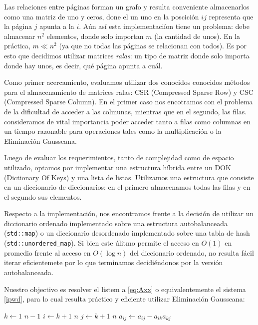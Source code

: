 
\par Las relaciones entre p\'aginas forman un grafo y resulta conveniente almacenarlos como una
matriz de uno y ceros, done el un uno en la poscici\'on $ij$ representa que la p\'agina $j$ apunta a la $i$.
A\'un as\'i esta implementaci\'ion tiene un problema: debe almacenar $n^2$ elementos, donde solo importan
$m$ (la cantidad de unos). En la pr\'actica, $m \ll n^2$ (ya que no todas las p\'aginas se relacionan
con todos). Es por esto que decidimos utilizar matrices \textit{ralas}: un tipo de matriz donde solo
importa donde hay unos, es decir, qu\'e p\'agina apunta a cu\'al.
\par Como primer acercamiento, evaluamos utilizar dos conocidos conocidos m\'etodos para el almacenamiento
de matrices ralas: CSR (Compressed Sparse Row) y CSC (Compressed Sparse Column). En el primer caso
nos encotramos con el problema de la dificultad de acceder a las colmunas, mientras que en el segundo,
las filas. consideramos de vital importancia poder acceder tanto a filas como columnas en un tiempo
razonable para operaciones tales como la multiplicación o la Eliminación Gausseana.
\par Luego de evaluar los requerimientos, tanto de complejidad como de espacio utilizado, optamos
por implementar una estructura h\'ibrida entre un DOK (Dictionary Of Keys) y una lista de listas. 
Utilizamos una estructura que consiste en un diccionario de diccionarios: en el primero almacenamos
todas las filas y en el segundo sus elementos.
\par Respecto a la implementaci\'on, nos encontramos frente a la decisión de utilizar un diccionario ordenado
implementado sobre una estructura autobalanceada (\verb|std::map|) o un diccionario desordenado
implementado sobre una tabla de hash (\verb|std::unordered_map|). Si bien este \'ulitmo permite
el acceso en $O(1)$ en promedio frente al acceso en $O(\log n)$ del diccionario ordenado, 
no resulta f\'acil iterar eficientemete por lo que terminamos decidi\'endonos por la versi\'on autobalanceada.
\par Nuestro objectivo es resolver el listem a \ref{eq:Axx} o equivalentemente el sistema \ref{ipwd}, para lo cual 
resulta pr\'actico y eficiente utilizar Eliminación Gausseana:

\begin{codebox}
\li \For $k \gets 1$ \To $n-1$
    \Do
\li     \For $i \gets k+1$ \To $n$
            \Do
\li         \For $j \gets k+1$ \To $n$
                \Do
\li                 $a_{ij} \gets a_{ij} - a_{ik}a_{kj}$
                \End
            \End
        \End
\end{codebox}


